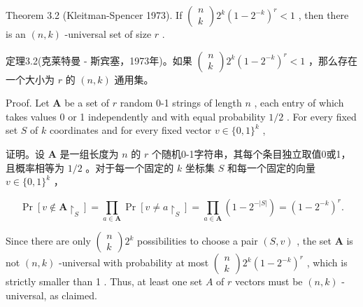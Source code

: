 \documentclass[10pt]{article}
\begin{document}
Theorem 3.2 (Kleitman-Spencer 1973). If \(\left( \begin{array}{l} n \\  k \end{array}\right) {2}^{k}{\left( 1 - {2}^{-k}\right) }^{r} < 1\) , then there is an \(\left( {n,k}\right)\) -universal set of size \(r\) .

\begin{tcolorbox}\relax
定理3.2(克莱特曼 - 斯宾塞，1973年)。如果 \(\left( \begin{array}{l} n \\  k \end{array}\right) {2}^{k}{\left( 1 - {2}^{-k}\right) }^{r} < 1\) ，那么存在一个大小为 \(r\) 的 \(\left( {n,k}\right)\) 通用集。
\end{tcolorbox}

Proof. Let \(\mathbf{A}\) be a set of \(r\) random 0-1 strings of length \(n\) , each entry of which takes values 0 or 1 independently and with equal probability \(1/2\) . For every fixed set \(S\) of \(k\) coordinates and for every fixed vector \(v \in  \{ 0,1{\} }^{k}\) ,

\begin{tcolorbox}\relax
证明。设 \(\mathbf{A}\) 是一组长度为 \(n\) 的 \(r\) 个随机0-1字符串，其每个条目独立取值0或1，且概率相等为 \(1/2\) 。对于每一个固定的 \(k\) 坐标集 \(S\) 和每一个固定的向量 \(v \in  \{ 0,1{\} }^{k}\) ，
\end{tcolorbox}

\[
\Pr \left\lbrack  {v \notin  \mathbf{A}{ \upharpoonright  }_{S}}\right\rbrack   = \mathop{\prod }\limits_{{a \in  \mathbf{A}}}\Pr \left\lbrack  {v \neq  a{ \upharpoonright  }_{S}}\right\rbrack   = \mathop{\prod }\limits_{{a \in  \mathbf{A}}}\left( {1 - {2}^{-\left| S\right| }}\right)  = {\left( 1 - {2}^{-k}\right) }^{r}.
\]

Since there are only \(\left( \begin{array}{l} n \\  k \end{array}\right) {2}^{k}\) possibilities to choose a pair \(\left( {S,v}\right)\) , the set \(\mathbf{A}\) is not \(\left( {n,k}\right)\) -universal with probability at most \(\left( \begin{array}{l} n \\  k \end{array}\right) {2}^{k}{\left( 1 - {2}^{-k}\right) }^{r}\) , which is strictly smaller than 1 . Thus, at least one set \(A\) of \(r\) vectors must be \(\left( {n,k}\right)\) -universal, as claimed.
\end{document}
